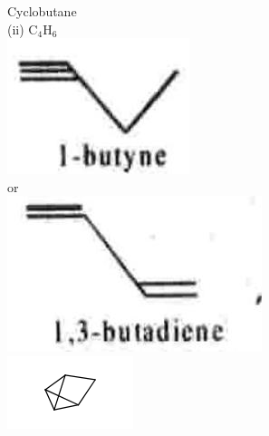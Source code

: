 \documentclass[10pt]{article}
\begin{document}
Cyclobutane\\
(ii) $\mathrm{C}_{4} \mathrm{H}_{6}$\\
\includegraphics[max width=\textwidth, center]{2025_01_28_8470952b98110cec3aabg-039(8)}\\
or\\
\includegraphics[max width=\textwidth, center]{2025_01_28_8470952b98110cec3aabg-039(12)}\\
\includegraphics{smile-b803be5e75f7f9f1c10db08904df137a9d0bb49e}\\
\end{document}
